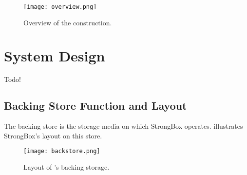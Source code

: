 \begin{figure}[t]
 \centering
  \texttt{[image: overview.png]}
   \caption{Overview of the \SYSTEM{} construction.}\label{fig:overview}
\end{figure}

\section{\SYSTEM{} System Design}\label{sec:design}

Todo!

\subsection{Backing Store Function and Layout}

The backing store is the storage media on which StrongBox operates.
 illustrates StrongBox's layout on this store.

\begin{figure}[t]
 \centering
  \texttt{[image: backstore.png]}
   \caption{Layout of \SYSTEM{}'s backing storage.}\label{fig:backstore}
\end{figure}
